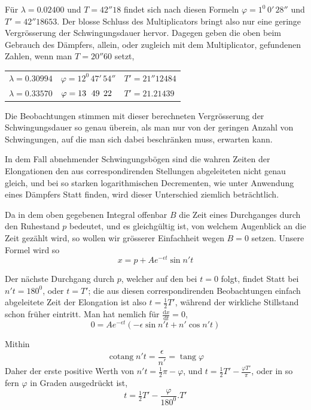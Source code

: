 Für $\lambda=0.02400$ und $T=42''18$ findet sich nach diesen Formeln $\varphi=1^0\,0'\,28''$ und $T'=42''18653$. Der blosse Schluss des Multiplicators bringt also nur eine geringe Vergrösserung der Schwingungsdauer hervor. Dagegen geben die oben beim Gebrauch des Dämpfers, allein, oder zugleich mit dem Multiplicator, gefundenen Zahlen, wenn man $T=20''60$ setzt,
\begin{center}
\begin{tabular}{l|l|l}
$\lambda=0.30994$&$\varphi=12^0\,47'\,54''$&$T'=21''12484$\\
$\lambda=0.33570$&$\varphi=13\hphantom{{}^0}\,49\hphantom{{}'}\,22$&$T'=21.21439$
\end{tabular}
\end{center}

Die Beobachtungen stimmen mit dieser berechneten Vergrösserung der Schwingungsdauer so genau überein, als man nur von der geringen Anzahl von Schwingungen, auf die man sich dabei beschränken muss, erwarten kann.

In dem Fall abnehmender Schwingungsbögen sind die wahren Zeiten der Elongationen den aus correspondirenden Stellungen abgeleiteten nicht genau gleich, und bei so starken logarithmischen Decrementen, wie unter Anwendung eines Dämpfers Statt finden, wird dieser Unterschied ziemlich beträchtlich.

Da in dem oben gegebenen Integral offenbar $B$ die Zeit eines Durchganges durch den Ruhestand $p$ bedeutet, und es gleichgültig ist, von welchem Augenblick an die Zeit gezählt wird, so wollen wir grösserer Einfachheit wegen $B=0$ setzen. Unsere Formel wird so
\[
x=p+Ae^{-\epsilon t}\sin n't
\]

Der nächste Durchgang durch $p$, welcher auf den bei $t=0$ folgt, findet Statt bei $n't=180^0$, oder $t=T'$; die aus diesen correspondirenden Beobachtungen einfach abgeleitete Zeit der Elongation ist also $t=\tfrac12T'$, während der wirkliche Stillstand schon früher eintritt. Man hat nemlich für $\frac{\mathrm{d}x}{\mathrm{d}t}=0$,
\[
0=Ae^{-\epsilon t}(-\epsilon\sin n't+n'\cos n't)
\]
\par\clearpage
{}
\noindent Mithin
\[
\operatorname{cotang}n't=\frac{\epsilon}{n'}=\operatorname{tang}\varphi
\]
Daher der erste positive Werth von $n't=\tfrac12\pi-\varphi$, und $t=\tfrac12T'-\frac{\varphi T'}{\pi}$, oder in so fern $\varphi$ in Graden ausgedrückt ist,
\[
t=\tfrac12T'-\frac{\varphi}{180^0}.T'
\]

